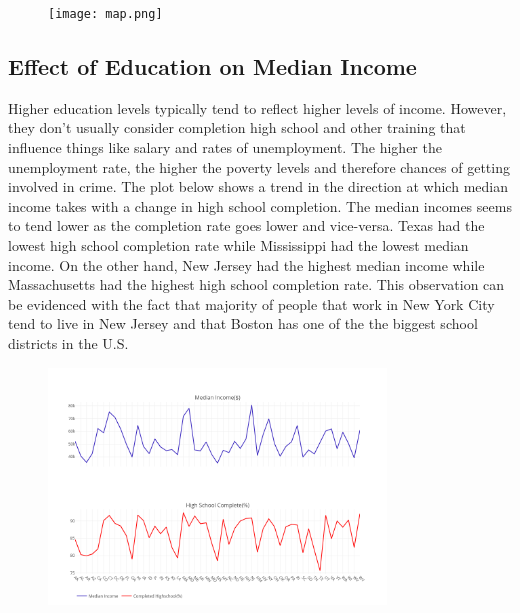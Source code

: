 \documentclass[a4paper,12pt]{article}
\begin{document}
\begin{figure}[hbt!]
    \centering
    \texttt{[image: map.png]}
    \caption{}
\end{figure}
\FloatBarrier

\subsection{Effect of Education on Median Income}
Higher education levels typically tend to reflect higher levels of income. However, they don't usually consider completion high school and other training that influence things like salary and rates of unemployment. The higher the unemployment rate, the higher the poverty levels and therefore chances of getting involved in crime. The plot below shows a trend in the direction at which median income takes with a change in high school completion. The median incomes seems to tend lower as the completion rate goes lower and vice-versa. Texas had the lowest high school completion rate while Mississippi had the lowest median income. On the other hand, New Jersey had the highest median income while Massachusetts had the highest high school completion rate. This observation can be evidenced with the fact that majority of people that work in New York City tend to live in New Jersey and that Boston has one of the the biggest school districts in the U.S.

\begin{figure}[hbt!]
    \centering
    \includegraphics[width=0.8\textwidth]{income-subplots-shared-yaxes.png}
    \caption{}
\end{figure}
\FloatBarrier
\end{document}
